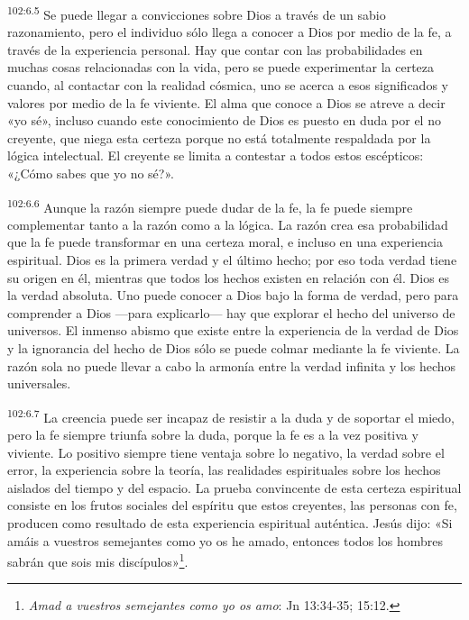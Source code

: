 \par
\textsuperscript{102:6.5} Se puede llegar a convicciones sobre Dios a través de un sabio razonamiento, pero el individuo sólo llega a conocer a Dios por medio de la fe, a través de la experiencia personal. Hay que contar con las probabilidades en muchas cosas relacionadas con la vida, pero se puede experimentar la certeza cuando, al contactar con la realidad cósmica, uno se acerca a esos significados y valores por medio de la fe viviente. El alma que conoce a Dios se atreve a decir «yo sé», incluso cuando este conocimiento de Dios es puesto en duda por el no creyente, que niega esta certeza porque no está totalmente respaldada por la lógica intelectual. El creyente se limita a contestar a todos estos escépticos: «¿Cómo sabes que yo no sé?».

\par
\textsuperscript{102:6.6} Aunque la razón siempre puede dudar de la fe, la fe puede siempre complementar tanto a la razón como a la lógica. La razón crea esa probabilidad que la fe puede transformar en una certeza moral, e incluso en una experiencia espiritual. Dios es la primera verdad y el último hecho; por eso toda verdad tiene su origen en él, mientras que todos los hechos existen en relación con él. Dios es la verdad absoluta. Uno puede conocer a Dios bajo la forma de verdad, pero para comprender a Dios ---para explicarlo--- hay que explorar el hecho del universo de universos. El inmenso abismo que existe entre la experiencia de la verdad de Dios y la ignorancia del hecho de Dios sólo se puede colmar mediante la fe viviente. La razón sola no puede llevar a cabo la armonía entre la verdad infinita y los hechos universales.

\par
\textsuperscript{102:6.7} La creencia puede ser incapaz de resistir a la duda y de soportar el miedo, pero la fe siempre triunfa sobre la duda, porque la fe es a la vez positiva y viviente. Lo positivo siempre tiene ventaja sobre lo negativo, la verdad sobre el error, la experiencia sobre la teoría, las realidades espirituales sobre los hechos aislados del tiempo y del espacio. La prueba convincente de esta certeza espiritual consiste en los frutos sociales del espíritu que estos creyentes, las personas con fe, producen como resultado de esta experiencia espiritual auténtica. Jesús dijo: «Si amáis a vuestros semejantes como yo os he amado, entonces todos los hombres sabrán que sois mis discípulos»\footnote{\textit{Amad a vuestros semejantes como yo os amo}: Jn 13:34-35; 15:12.}.

